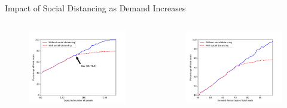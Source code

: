    \begin{frame}{Impact of Social Distancing as Demand Increases}
      \vspace{-0.4cm}
        

      \begin{columns}
        \column{6cm}  %
          \begin{figure}[ht]
            \centering
            \includegraphics[width = 1\textwidth]{./images/without2.pdf}
          \end{figure}
          \column{6cm}
          \scriptsize
          \begin{figure}[ht]
            \centering
            \includegraphics[width = 1\textwidth]{./images/without1.pdf}

\end{figure}
\end{columns}
\end{frame}
